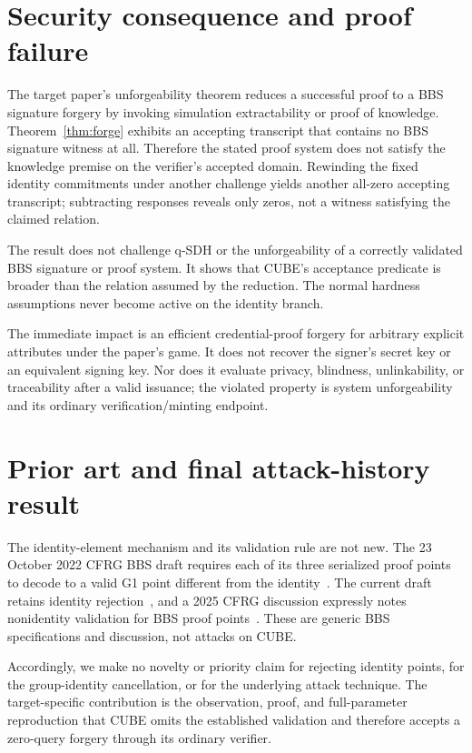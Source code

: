 \documentclass[10pt,a4paper]{article}
\begin{document}
\section{Security consequence and proof failure}

The target paper's unforgeability theorem reduces a successful proof to a BBS
signature forgery by invoking simulation extractability or proof of knowledge.
Theorem~\ref{thm:forge} exhibits an accepting transcript that contains no BBS
signature witness at all. Therefore the stated proof system does not satisfy
the knowledge premise on the verifier's accepted domain. Rewinding the fixed
identity commitments under another challenge yields another all-zero accepting
transcript; subtracting responses reveals only zeros, not a witness satisfying
the claimed relation.

The result does not challenge q-SDH or the unforgeability of a correctly
validated BBS signature or proof system. It shows that CUBE's acceptance
predicate is broader than the relation assumed by the reduction. The normal
hardness assumptions never become active on the identity branch.

The immediate impact is an efficient credential-proof forgery for arbitrary
explicit attributes under the paper's game. It does not recover the signer's
secret key or an equivalent signing key. Nor does it evaluate privacy,
blindness, unlinkability, or traceability after a valid issuance; the violated
property is system unforgeability and its ordinary verification/minting
endpoint.

\section{Prior art and final attack-history result}

The identity-element mechanism and its validation rule are not new. The 23
October 2022 CFRG BBS draft requires each of its three serialized proof points
to decode to a valid G1 point different from the identity~\cite{bbsdraft01}.
The current draft retains identity rejection~\cite{bbsdraft13}, and a 2025
CFRG discussion expressly notes nonidentity validation for BBS proof
points~\cite{cfrgmessage}. These are generic BBS specifications and discussion,
not attacks on CUBE.

Accordingly, we make no novelty or priority claim for rejecting identity
points, for the group-identity cancellation, or for the underlying attack
technique. The target-specific contribution is the observation, proof, and
full-parameter reproduction that CUBE omits the established validation and
therefore accepts a zero-query forgery through its ordinary verifier.
\end{document}

